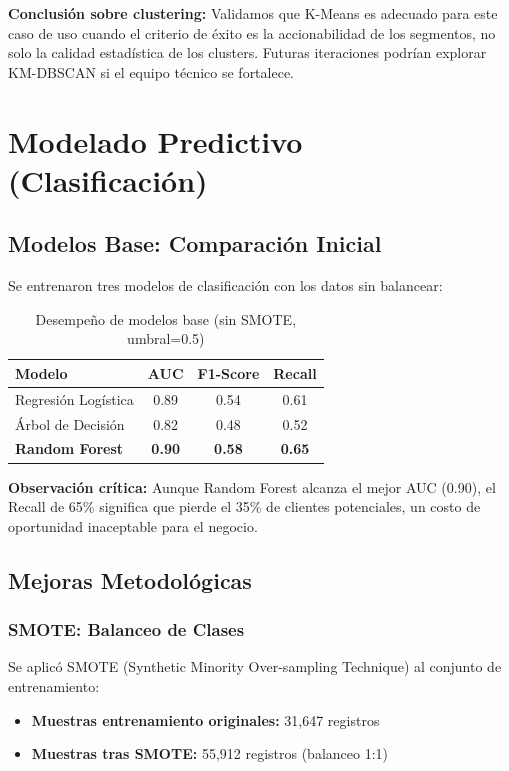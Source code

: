 \documentclass[12pt,letterpaper]{article}
\begin{document}
\textbf{Conclusión sobre clustering:} Validamos que K-Means es adecuado para este caso de uso cuando el criterio de éxito es la accionabilidad de los segmentos, no solo la calidad estadística de los clusters. Futuras iteraciones podrían explorar KM-DBSCAN si el equipo técnico se fortalece.

\newpage
\section{Modelado Predictivo (Clasificación)}

\subsection{Modelos Base: Comparación Inicial}

Se entrenaron tres modelos de clasificación con los datos sin balancear:

\begin{table}[H]
\centering
\caption{Desempeño de modelos base (sin SMOTE, umbral=0.5)}
\label{tab:modelos_base}
\begin{tabular}{@{}lccc@{}}
\toprule
\textbf{Modelo} & \textbf{AUC} & \textbf{F1-Score} & \textbf{Recall} \\
\midrule
Regresión Logística & 0.89 & 0.54 & 0.61 \\
Árbol de Decisión & 0.82 & 0.48 & 0.52 \\
\textbf{Random Forest} & \textbf{0.90} & \textbf{0.58} & \textbf{0.65} \\
\bottomrule
\end{tabular}
\end{table}

\textbf{Observación crítica:} Aunque Random Forest alcanza el mejor AUC (0.90), el Recall de 65\% significa que pierde el 35\% de clientes potenciales, un costo de oportunidad inaceptable para el negocio.

\subsection{Mejoras Metodológicas}

\subsubsection{SMOTE: Balanceo de Clases}

Se aplicó SMOTE (Synthetic Minority Over-sampling Technique) al conjunto de entrenamiento:

\begin{itemize}
    \item \textbf{Muestras entrenamiento originales:} 31,647 registros
    \item \textbf{Muestras tras SMOTE:} 55,912 registros (balanceo 1:1)
\end{itemize}
\end{document}
